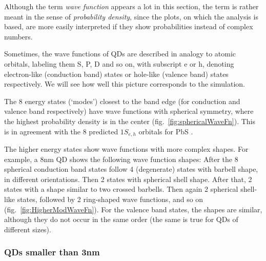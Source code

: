 \begin{REMARK}
Although the term \textit{wave function} appears a lot in this section, the term is rather meant in the sense of \textit{probability density}, since the plots, on which the analysis is based, are more easily interpreted if they show probabilities instead of complex numbers.
\end{REMARK}

Sometimes, the wave functions of QDs are described in analogy to atomic orbitals, labeling them S, P, D and so on, with subscript e or h, denoting electron-like (conduction band) states or hole-like (valence band) states respectively. We will see how well this picture corresponds to the simulation.

The 8 energy states (`modes') closest to the band edge (for conduction and valence band respectively) have wave functions with spherical symmetry, where the highest probability density is in the center (fig.~\ref{fig:sphericalWaveFn}). This is in agreement with the 8 predicted $1S_{e,h}$ orbitals for PbS \cite[p.410]{ChemRev}.
	
The higher energy states show wave functions with more complex shapes. For example, a 8nm QD shows the following wave function shapes: After the 8 spherical conduction band states follow 4 (degenerate) states with barbell shape, in different orientations. Then 2 states with spherical shell shape. After that, 2 states with a shape similar to two crossed barbells. Then again 2 spherical shell-like states, followed by 2 ring-shaped wave functions, and so on (fig.~\ref{fig:HigherModWaveFn}). For the valence band states, the shapes are similar, although they do not occur in the same order (the same is true for QDs of different sizes).

\subsubsection{QDs smaller than 3nm}	

